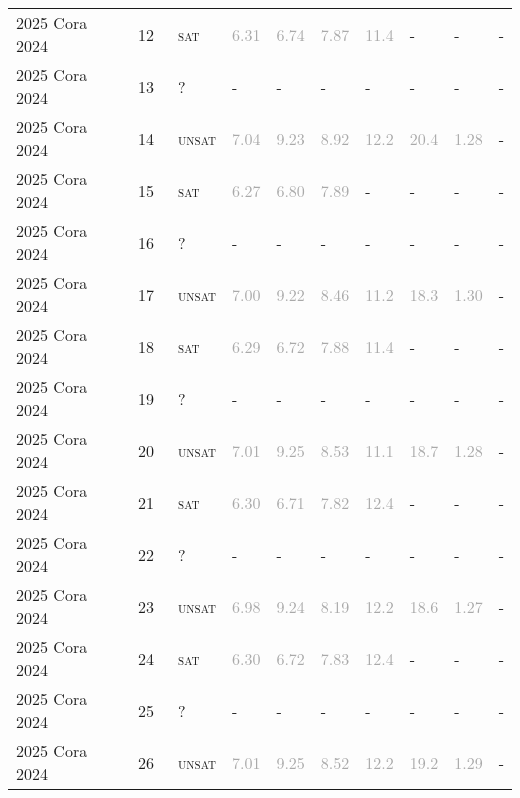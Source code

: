 \begin{center}
{\begin{longtable}{@{}llllllllll@{}}
2025 Cora 2024 & 12 & ~\textsc{sat} & \textcolor{darkgray}{6.31} & \textcolor{darkgray}{6.74} & \textcolor{darkgray}{7.87} & \textcolor{darkgray}{11.4} & - & - & - \\
2025 Cora 2024 & 13 & ~? & - & - & - & - & - & - & - \\
2025 Cora 2024 & 14 & ~\textsc{unsat} & \textcolor{darkgray}{7.04} & \textcolor{darkgray}{9.23} & \textcolor{darkgray}{8.92} & \textcolor{darkgray}{12.2} & \textcolor{darkgray}{20.4} & \textcolor{darkgray}{1.28} & - \\
2025 Cora 2024 & 15 & ~\textsc{sat} & \textcolor{darkgray}{6.27} & \textcolor{darkgray}{6.80} & \textcolor{darkgray}{7.89} & - & - & - & - \\
2025 Cora 2024 & 16 & ~? & - & - & - & - & - & - & - \\
2025 Cora 2024 & 17 & ~\textsc{unsat} & \textcolor{darkgray}{7.00} & \textcolor{darkgray}{9.22} & \textcolor{darkgray}{8.46} & \textcolor{darkgray}{11.2} & \textcolor{darkgray}{18.3} & \textcolor{darkgray}{1.30} & - \\
2025 Cora 2024 & 18 & ~\textsc{sat} & \textcolor{darkgray}{6.29} & \textcolor{darkgray}{6.72} & \textcolor{darkgray}{7.88} & \textcolor{darkgray}{11.4} & - & - & - \\
2025 Cora 2024 & 19 & ~? & - & - & - & - & - & - & - \\
2025 Cora 2024 & 20 & ~\textsc{unsat} & \textcolor{darkgray}{7.01} & \textcolor{darkgray}{9.25} & \textcolor{darkgray}{8.53} & \textcolor{darkgray}{11.1} & \textcolor{darkgray}{18.7} & \textcolor{darkgray}{1.28} & - \\
2025 Cora 2024 & 21 & ~\textsc{sat} & \textcolor{darkgray}{6.30} & \textcolor{darkgray}{6.71} & \textcolor{darkgray}{7.82} & \textcolor{darkgray}{12.4} & - & - & - \\
2025 Cora 2024 & 22 & ~? & - & - & - & - & - & - & - \\
2025 Cora 2024 & 23 & ~\textsc{unsat} & \textcolor{darkgray}{6.98} & \textcolor{darkgray}{9.24} & \textcolor{darkgray}{8.19} & \textcolor{darkgray}{12.2} & \textcolor{darkgray}{18.6} & \textcolor{darkgray}{1.27} & - \\
2025 Cora 2024 & 24 & ~\textsc{sat} & \textcolor{darkgray}{6.30} & \textcolor{darkgray}{6.72} & \textcolor{darkgray}{7.83} & \textcolor{darkgray}{12.4} & - & - & - \\
2025 Cora 2024 & 25 & ~? & - & - & - & - & - & - & - \\
2025 Cora 2024 & 26 & ~\textsc{unsat} & \textcolor{darkgray}{7.01} & \textcolor{darkgray}{9.25} & \textcolor{darkgray}{8.52} & \textcolor{darkgray}{12.2} & \textcolor{darkgray}{19.2} & \textcolor{darkgray}{1.29} & - \\

\end{longtable}}
\end{center}
